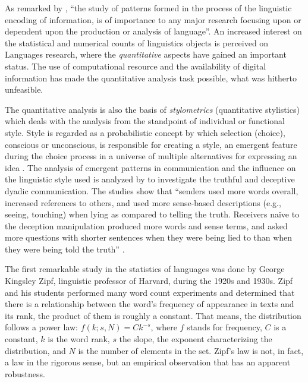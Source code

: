 As remarked by \cite{sedelow1966}, ``the study of patterns formed in the process of the
linguistic encoding of information, is of importance to any major research focusing upon
or dependent upon the production or analysis of language''. An increased interest on
the statistical and numerical counts of linguistics objects is perceived on Languages research,
where the \textit{quantitative} aspects have gained an important status. The use of 
computational resource and the availability of digital information has made the quantitative analysis 
task possible, what was hitherto unfeasible.

The quantitative analysis is also the basis of \textit{stylometrics} (quantitative stylistics)
which deals with the analysis from the standpoint of individual or functional style.
Style is regarded as a probabilistic concept by which selection
(choice), conscious or unconscious, is responsible for creating a style,
an emergent feature during the choice process in a universe of multiple
alternatives for expressing an idea \citep{tuldava2004}.
The analysis of emergent patterns in communication and the influence on the linguistic style 
used is analyzed by \cite{hancock2004} to investigate the truthful and deceptive
dyadic communication. The studies show that ``senders used more words overall,
increased references to others, and used more sense-based descriptions (e.g., seeing, touching) when lying as compared
to telling the truth. Receivers naïve to the deception manipulation produced more words and sense terms, and
asked more questions with shorter sentences when they were being lied to than when they were being told the truth''
\citep{hancock2004}.



The first remarkable study in the statistics of languages was done by George Kingsley Zipf, 
linguistic professor of Harvard, during the 1920s and 1930s. Zipf and his students performed many 
word count experiments and determined that there is a relationship between the word's frequency of 
appearance in texts and its rank, the product of them is roughly a constant. 
That means, the distribution follows a power law: $f(k;s,N) = C k^{-s}$, where $f$ stands for frequency, 
$C$ is a constant, $k$ is the word rank, $s$ the slope, the exponent characterizing the distribution, 
and $N$ is the number of elements in the set. Zipf's law is not, in fact, a law in the rigorous
sense, but an empirical observation that has an apparent robustness.

